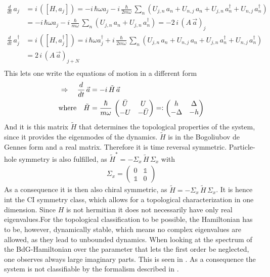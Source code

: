 \begin{align*}
    \frac{d}{dt}\,{a}_j &= i\,([H,{a}_j]) = -i\, \hbar\omega a_j - i\,\frac{\hbar}{2m\omega}\,\sum_n \left(U_{j,n}\,a_n + U_{n,j}\,a_n + U_{j,n}\,a_n^\dagger + U_{n,j}\,a_n^\dagger\right) \\
    &= -i\, \hbar\omega a_j -i\,\frac{\hbar}{m\omega}\,\sum_n \left(U_{j,n}\,a_n + U_{j,n}\,a_n^\dagger \right) = -2\,i\,(A\,\vec{a})_j\\
    \frac{d}{dt}\,{a}^\dagger_j &= i\,([H,{a}^\dagger_j]) = i\, \hbar\omega a_j^\dagger  +i\,\frac{\hbar}{2m\omega}\,\sum_n \left(U_{j,n}\,a_n + U_{n,j}\,a_n + U_{j,n}\,a_n^\dagger + U_{n,j}\,a_n^\dagger\right) \\
    &=  2\,i\,(A\,\vec{a})_{j+N}\\
\end{align*}
This lets one write the equations of motion in a different form
\begin{align*}
    \Rightarrow\quad \frac{d}{dt}\,\vec{a} &= -i\,\tilde{H}\,\vec{a}\\
    \text{where}\quad \tilde{H} &= \frac{\hbar}{m\omega}\,\begin{pmatrix}
       \bar{U} & U \\
       -U & -\bar{U}
       \end{pmatrix}=\vcentcolon \begin{pmatrix}
        h & \Delta\\
        -\Delta & -h
       \end{pmatrix}
\end{align*}
And it is this matrix $\tilde{H}$ that determines the topological properties of the system, since it provides the eigenmodes of the dynamics. $\tilde{H}$ is in the Bogoliubov de Gennes form and a real matrix. Therefore it is time reversal symmetric. Particle-hole symmetry is also fulfilled, as $\tilde{H}^*=-\Sigma_x\,\tilde{H}\,\Sigma_x$ with 
\begin{align*}\Sigma_x=\begin{pmatrix}
    0 & \mathbb{1}\\
    \mathbb{1} & 0
\end{pmatrix}\end{align*}
As a consequence it is then also chiral symmetric, as $\tilde{H}=-\Sigma_x\,\tilde{H}\,\Sigma_x$. It is hence int the CI symmetry class, which allows for a topological characterization in one dimension. 
Since $H$ is not hermitian it does not necessarily have only real eigenvalues.For the topological classification to be possible, the Hamiltonian has to be, however, dynamically stable, which means no complex eigenvalues are allowed, as they lead to unbounded dynamics. When looking at the spectrum of the BdG-Hamiltonian over the parameter that lets the first order be neglected, one observes always large imaginary parts. This is seen in . As a consequence the system is not classifiable by the formalism described in \cite{peanoTopologicalEdgeStates2018}.
